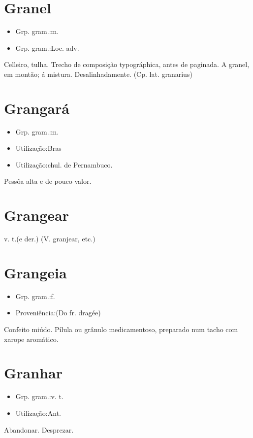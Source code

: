 \section{Granel}
\begin{itemize}
\item {Grp. gram.:m.}
\end{itemize}
\begin{itemize}
\item {Grp. gram.:Loc. adv.}
\end{itemize}
Celleiro, tulha.
Trecho de composição typográphica, antes de paginada.
\textunderscore A granel\textunderscore , em montão; á mistura.
Desalinhadamente.
(Cp. lat. \textunderscore granarius\textunderscore )
\section{Grangará}
\begin{itemize}
\item {Grp. gram.:m.}
\end{itemize}
\begin{itemize}
\item {Utilização:Bras}
\end{itemize}
\begin{itemize}
\item {Utilização:chul. de Pernambuco.}
\end{itemize}
Pessôa alta e de pouco valor.
\section{Grangear}
\textunderscore v. t.\textunderscore  (e der.)
(V. \textunderscore granjear\textunderscore , etc.)
\section{Grangeia}
\begin{itemize}
\item {Grp. gram.:f.}
\end{itemize}
\begin{itemize}
\item {Proveniência:(Do fr. \textunderscore dragée\textunderscore )}
\end{itemize}
Confeito miúdo.
Pílula ou grânulo medicamentoso, preparado num tacho com xarope aromático.
\section{Granhar}
\begin{itemize}
\item {Grp. gram.:v. t.}
\end{itemize}
\begin{itemize}
\item {Utilização:Ant.}
\end{itemize}
Abandonar.
Desprezar.
